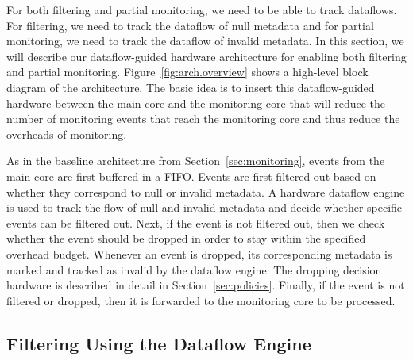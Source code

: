 For both filtering and partial monitoring, we need to be able to track
dataflows. For filtering, we need to track the dataflow of null metadata and
for partial monitoring, we need to track the dataflow of invalid metadata.
In this section, we will describe our dataflow-guided hardware architecture for
enabling both filtering and partial monitoring.
Figure~\ref{fig:arch.overview} shows a high-level block diagram of the
architecture. The basic idea is to insert this dataflow-guided hardware between the main core and
the monitoring core that will reduce the number of monitoring events that reach
the monitoring core and thus reduce the overheads of monitoring.

As in the baseline architecture from Section~\ref{sec:monitoring}, events from
the main core are first buffered in a FIFO. 
Events are first filtered out based on whether they correspond to null or
invalid metadata. A hardware dataflow engine is used to track the flow of null
and invalid metadata and decide whether
specific events can be filtered out.
Next, if the event is not filtered out, then we
check whether the event should be dropped in order to stay within the specified
overhead budget. Whenever an event is dropped, its corresponding metadata is
marked and tracked as invalid by the dataflow engine. The
dropping decision hardware is described in detail in Section~\ref{sec:policies}.
Finally, if the event is not filtered or dropped, then it is forwarded to the
monitoring core to be processed.

\subsection{Filtering Using the Dataflow Engine}
\label{sec:arch.dataflow}

